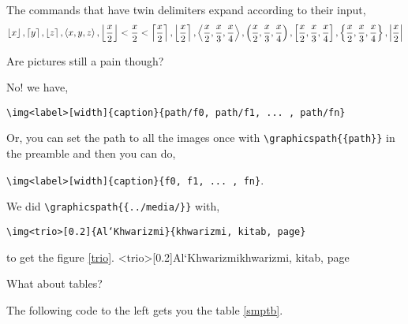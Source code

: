 \documentclass{homework}
\newcommand{\bk}{\textbackslash}
\begin{document}
The commands that have twin delimiters expand according to their input,
\[
  \left\lfloor x\right\rfloor, \left\lceil y\right\rceil, \left\lfloor z\right\rceil, \left\langle x,y,z\right\rangle,
  \left\lfloor\frac{x}{2}\right\rfloor < \frac{x}{2} < \left\lceil\frac{x}{2}\right\rceil,
  \left\lfloor\frac{x}{2}\right\rceil,
  \left\langle\frac{x}{2}, \frac{x}{3}, \frac{x}{4}\right\rangle,
  \left(\frac{x}{2}, \frac{x}{3}, \frac{x}{4}\right),
  \left[\frac{x}{2}, \frac{x}{3}, \frac{x}{4}\right],
  \left\{\frac{x}{2}, \frac{x}{3}, \frac{x}{4}\right\},
  \left|\frac{x}{2}\right|
\]

\question Are pictures still a pain though?

No! we have,
\begin{center}
    \texttt{\bk img<label>[width]\{caption\}\{path/f0, path/f1, ... , path/fn\}}
\end{center}
Or, you can set the path to all the images once with \texttt{\bk graphicspath\{\{path\}\}} in the preamble and then you can do,
\begin{center}
    \texttt{\bk img<label>[width]\{caption\}\{f0, f1, ... , fn\}}.
\end{center}
We did \texttt{\bk graphicspath\{\{../media/\}\}} with,
\begin{center}
    \texttt{\bk img<trio>[0.2]\{Al`Khwarizmi\}\{khwarizmi, kitab, page\}}
\end{center}
to get the figure \ref{trio}.
\img<trio>[0.2]{Al`Khwarizmi}{khwarizmi, kitab, page}

\question What about tables?

The following code to the left gets you the table \ref{smptb}.
\end{document}
